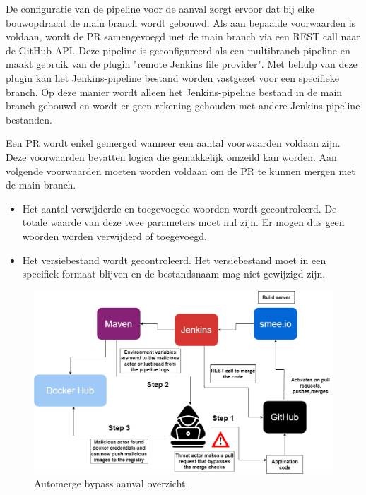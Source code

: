 De configuratie van de pipeline voor de aanval zorgt ervoor dat bij elke bouwopdracht de main branch wordt gebouwd. Als aan bepaalde voorwaarden is voldaan, wordt de PR samengevoegd met de main branch via een REST call naar de GitHub API. Deze pipeline is geconfigureerd als een multibranch-pipeline en maakt gebruik van de plugin "remote Jenkins file provider". Met behulp van deze plugin kan het Jenkins-pipeline bestand worden vastgezet voor een specifieke branch. Op deze manier wordt alleen het Jenkins-pipeline bestand in de main branch gebouwd en wordt er geen rekening gehouden met andere Jenkins-pipeline bestanden.
\newline

Een PR wordt enkel gemerged wanneer een aantal voorwaarden voldaan zijn. Deze voorwaarden bevatten logica die gemakkelijk omzeild kan worden. Aan volgende voorwaarden moeten worden voldaan om de PR te kunnen mergen met de main branch.

\begin{itemize}
  \item Het aantal verwijderde en toegevoegde woorden wordt gecontroleerd. De totale waarde van deze twee parameters moet nul zijn. Er mogen dus geen woorden worden verwijderd of toegevoegd.
  \item Het versiebestand wordt gecontroleerd. Het versiebestand moet in een specifiek formaat blijven en de bestandsnaam mag niet gewijzigd zijn.
\end{itemize}

\begin{figure}[H]
  \includegraphics[scale=0.35]{graphics/attack2.png}
\caption{\label{fig:automerge} Automerge bypass aanval overzicht.}
\end{figure}

